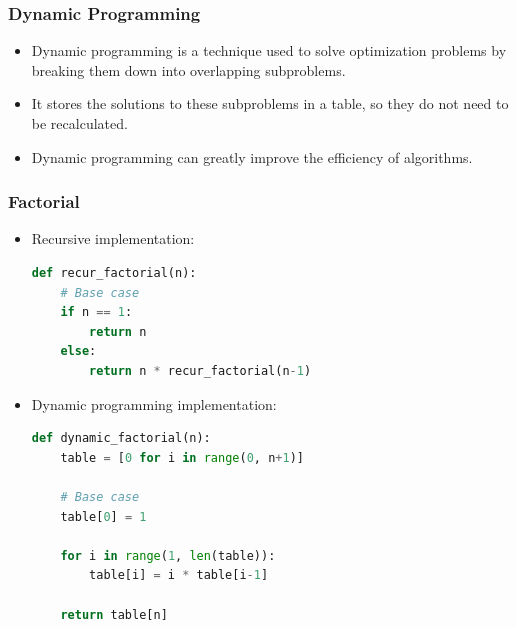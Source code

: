 \documentclass[handout]{beamer}
\begin{document}
\begin{frame}[fragile]
  \frametitle{Dynamic Programming}

  \begin{itemize}
    \item Dynamic programming is a technique used to solve optimization problems by breaking them down into overlapping subproblems.
    \item It stores the solutions to these subproblems in a table, so they do not need to be recalculated.
    \item Dynamic programming can greatly improve the efficiency of algorithms.
  \end{itemize}

\end{frame}

\begin{frame}[fragile]
  \frametitle{Factorial}

  \begin{itemize}
    \item Recursive implementation:

    \begin{lstlisting}[language=Python]
def recur_factorial(n):
    # Base case
    if n == 1:
        return n
    else:
        return n * recur_factorial(n-1)
    \end{lstlisting}

    \item Dynamic programming implementation:

    \begin{lstlisting}[language=Python]
def dynamic_factorial(n):
    table = [0 for i in range(0, n+1)]

    # Base case
    table[0] = 1

    for i in range(1, len(table)):
        table[i] = i * table[i-1]

    return table[n]
    \end{lstlisting}

  \end{itemize}

\end{frame}
\end{document}
